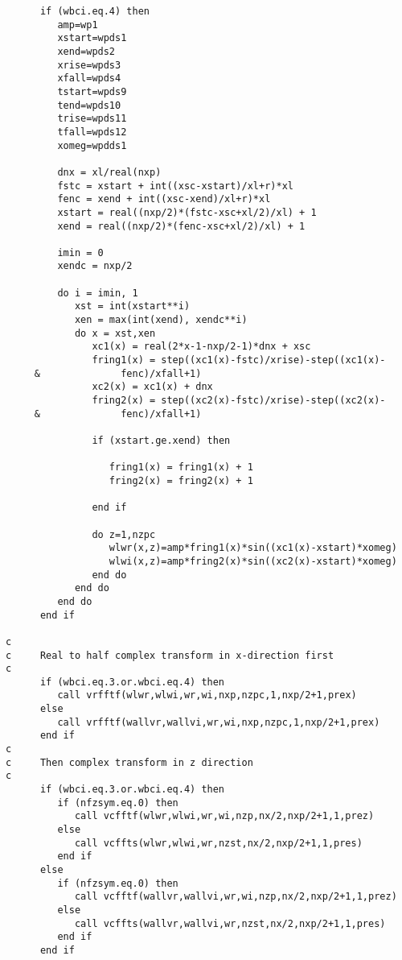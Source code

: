\begin{verbatim}
      if (wbci.eq.4) then
         amp=wp1
         xstart=wpds1
         xend=wpds2
         xrise=wpds3
         xfall=wpds4
         tstart=wpds9
         tend=wpds10       
         trise=wpds11
         tfall=wpds12
         xomeg=wpdds1
         
         dnx = xl/real(nxp)
         fstc = xstart + int((xsc-xstart)/xl+r)*xl
         fenc = xend + int((xsc-xend)/xl+r)*xl
         xstart = real((nxp/2)*(fstc-xsc+xl/2)/xl) + 1
         xend = real((nxp/2)*(fenc-xsc+xl/2)/xl) + 1
         
         imin = 0
         xendc = nxp/2
         
         do i = imin, 1
            xst = int(xstart**i)
            xen = max(int(xend), xendc**i)
            do x = xst,xen
               xc1(x) = real(2*x-1-nxp/2-1)*dnx + xsc
               fring1(x) = step((xc1(x)-fstc)/xrise)-step((xc1(x)-
     &              fenc)/xfall+1)
               xc2(x) = xc1(x) + dnx
               fring2(x) = step((xc2(x)-fstc)/xrise)-step((xc2(x)-
     &              fenc)/xfall+1)
               
               if (xstart.ge.xend) then

                  fring1(x) = fring1(x) + 1
                  fring2(x) = fring2(x) + 1

               end if
            
               do z=1,nzpc
                  wlwr(x,z)=amp*fring1(x)*sin((xc1(x)-xstart)*xomeg)
                  wlwi(x,z)=amp*fring2(x)*sin((xc2(x)-xstart)*xomeg)
               end do
            end do
         end do
      end if
      
c
c     Real to half complex transform in x-direction first
c
      if (wbci.eq.3.or.wbci.eq.4) then
         call vrfftf(wlwr,wlwi,wr,wi,nxp,nzpc,1,nxp/2+1,prex)
      else
         call vrfftf(wallvr,wallvi,wr,wi,nxp,nzpc,1,nxp/2+1,prex)
      end if
c
c     Then complex transform in z direction
c
      if (wbci.eq.3.or.wbci.eq.4) then
         if (nfzsym.eq.0) then
            call vcfftf(wlwr,wlwi,wr,wi,nzp,nx/2,nxp/2+1,1,prez)
         else
            call vcffts(wlwr,wlwi,wr,nzst,nx/2,nxp/2+1,1,pres)
         end if
      else
         if (nfzsym.eq.0) then
            call vcfftf(wallvr,wallvi,wr,wi,nzp,nx/2,nxp/2+1,1,prez)
         else
            call vcffts(wallvr,wallvi,wr,nzst,nx/2,nxp/2+1,1,pres)
         end if
      end if


\end{verbatim}
